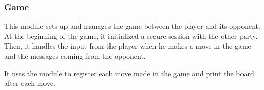 \subsubsection{Game}

This module sets up and manages the game between the player and its opponent. At
the beginning of the game, it initialized a secure session with the other party.
Then, it handles the input from the player when he makes a move in the game and
the messages coming from the opponent.

It uses the  module to register each move made in the game and
print the board after each move.
